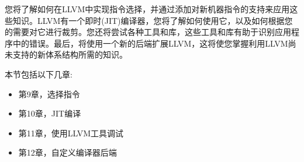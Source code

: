 您将了解如何在LLVM中实现指令选择，并通过添加对新机器指令的支持来应用这些知识。LLVM有一个即时(JIT)编译器，您将了解如何使用它，以及如何根据您的需要对它进行裁剪。您还将尝试各种工具和库，这些工具和库有助于识别应用程序中的错误。最后，将使用一个新的后端扩展LLVM，这将使您掌握利用LLVM尚未支持的新体系结构所需的知识。 \par

本节包括以下几章:\par

\begin{itemize}
	\item 第9章，选择指令
	\item 第10章，JIT编译
	\item 第11章，使用LLVM工具调试
	\item 第12章，自定义编译器后端
\end{itemize}

\newpage